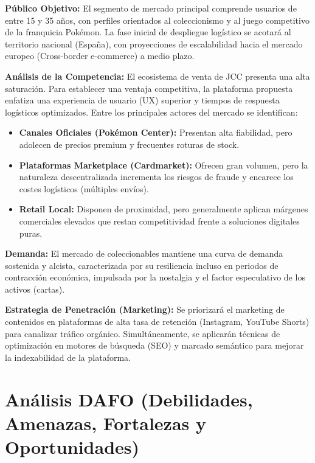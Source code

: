 \documentclass[12pt,a4paper]{article}
\begin{document}
\textbf{Público Objetivo:} El segmento de mercado principal comprende usuarios de entre 15 y 35 años, con perfiles orientados al coleccionismo y al juego competitivo de la franquicia Pokémon. La fase inicial de despliegue logístico se acotará al territorio nacional (España), con proyecciones de escalabilidad hacia el mercado europeo (Cross-border e-commerce) a medio plazo.

\textbf{Análisis de la Competencia:} El ecosistema de venta de JCC presenta una alta saturación. Para establecer una ventaja competitiva, la plataforma propuesta enfatiza una experiencia de usuario (UX) superior y tiempos de respuesta logísticos optimizados. Entre los principales actores del mercado se identifican:
    
    \begin{itemize}
        \item \textbf{Canales Oficiales (Pokémon Center):} Presentan alta fiabilidad, pero adolecen de precios premium y frecuentes roturas de stock.
        \item \textbf{Plataformas Marketplace (Cardmarket):} Ofrecen gran volumen, pero la naturaleza descentralizada incrementa los riesgos de fraude y encarece los costes logísticos (múltiples envíos).
        \item \textbf{Retail Local:} Disponen de proximidad, pero generalmente aplican márgenes comerciales elevados que restan competitividad frente a soluciones digitales puras.
    \end{itemize}

\textbf{Demanda:} El mercado de coleccionables mantiene una curva de demanda sostenida y alcista, caracterizada por su resiliencia incluso en periodos de contracción económica, impulsada por la nostalgia y el factor especulativo de los activos (cartas).

\textbf{Estrategia de Penetración (Marketing):} Se priorizará el marketing de contenidos en plataformas de alta tasa de retención (Instagram, YouTube Shorts) para canalizar tráfico orgánico. Simultáneamente, se aplicarán técnicas de optimización en motores de búsqueda (SEO) y marcado semántico para mejorar la indexabilidad de la plataforma.

\section{Análisis DAFO (Debilidades, Amenazas, Fortalezas y Oportunidades)}
\label{DAFO}
\end{document}
